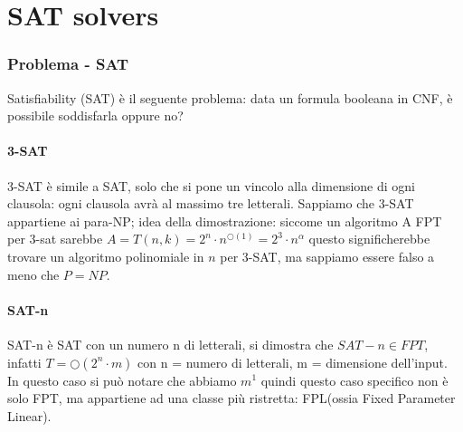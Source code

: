 \documentclass[12pt,a4paper]{article}
\begin{document}
\pagebreak
\part{SAT solvers}

\section{Problema - SAT}
Satisfiability (SAT) è il seguente problema: data un formula booleana in CNF, è possibile soddisfarla oppure no?

\subsection{3-SAT}
3-SAT è simile a SAT, solo che si pone un vincolo alla dimensione di ogni clausola: ogni clausola avrà al massimo tre letterali. Sappiamo che 3-SAT appartiene ai para-NP; idea della dimostrazione: siccome un algoritmo A FPT per 3-sat sarebbe $A = T(n, k) = 2^n \cdot n^{\bigcirc(1)} = 2^3 \cdot n^\alpha$ questo significherebbe trovare un algoritmo polinomiale in $n$ per 3-SAT, ma sappiamo essere falso a meno che $P = NP$.

\subsection{SAT-n}
SAT-n è SAT con un numero n di letterali, si dimostra che $SAT-n \in FPT$, infatti $T = \bigcirc(2^n \cdot m)$ con n = numero di letterali, m = dimensione dell'input. In questo caso si può notare che abbiamo $m^1$ quindi questo caso specifico non è solo FPT, ma appartiene ad una classe più ristretta: FPL(ossia Fixed Parameter Linear).
\end{document}
